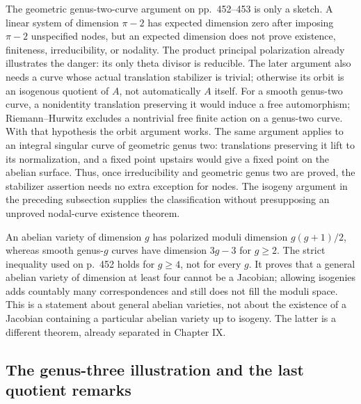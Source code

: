 The geometric genus-two-curve argument on pp.~452--453 is only a sketch. A linear system of dimension \(\pi-2\) has expected dimension zero after imposing \(\pi-2\) unspecified nodes, but an expected dimension does not prove existence, finiteness, irreducibility, or nodality. The product principal polarization already illustrates the danger: its only theta divisor is reducible. The later argument also needs a curve whose actual translation stabilizer is trivial; otherwise its orbit is an isogenous quotient of \(A\), not automatically \(A\) itself. For a smooth genus-two curve, a nonidentity translation preserving it would induce a free automorphism; Riemann--Hurwitz excludes a nontrivial free finite action on a genus-two curve. With that hypothesis the orbit argument works. The same argument applies to an integral singular curve of geometric genus two: translations preserving it lift to its normalization, and a fixed point upstairs would give a fixed point on the abelian surface. Thus, once irreducibility and geometric genus two are proved, the stabilizer assertion needs no extra exception for nodes. The isogeny argument in the preceding subsection supplies the classification without presupposing an unproved nodal-curve existence theorem.

An abelian variety of dimension \(g\) has polarized moduli dimension \(g(g+1)/2\), whereas smooth genus-\(g\) curves have dimension \(3g-3\) for \(g\ge2\). The strict inequality used on p.~452 holds for \(g\ge4\), not for every \(g\). It proves that a general abelian variety of dimension at least four cannot be a Jacobian; allowing isogenies adds countably many correspondences and still does not fill the moduli space. This is a statement about general abelian varieties, not about the existence of a Jacobian containing a particular abelian variety up to isogeny. The latter is a different theorem, already separated in Chapter IX.

\subsection{The genus-three illustration and the last quotient remarks}

